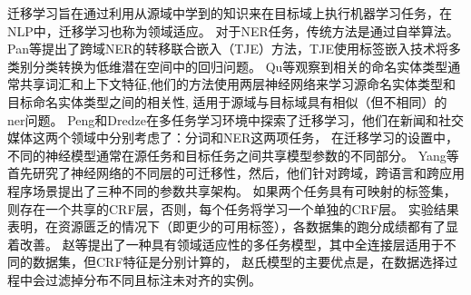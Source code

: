迁移学习旨在通过利用从源域中学到的知识来在目标域上执行机器学习任务\cite{pan2009survey}，在NLP中，迁移学习也称为领域适应。
对于NER任务，传统方法是通过自举算法。 
Pan等提出了跨域NER的转移联合嵌入（TJE）方法，TJE使用标签嵌入技术将多类别分类转换为低维潜在空间中的回归问题\cite{pan2013transfer}。 
Qu等观察到相关的命名实体类型通常共享词汇和上下文特征\cite{qu2016named},他们的方法使用两层神经网络来学习源命名实体类型和目标命名实体类型之间的相关性,
适用于源域与目标域具有相似（但不相同）的ner问题。 
Peng和Dredze在多任务学习环境中探索了迁移学习\cite{peng2016multi}，他们在新闻和社交媒体这两个领域中分别考虑了：分词和NER这两项任务，
在迁移学习的设置中，不同的神经模型通常在源任务和目标任务之间共享模型参数的不同部分。
Yang等首先研究了神经网络的不同层的可迁移性\cite{yang2017transfer}，然后，他们针对跨域，跨语言和跨应用程序场景提出了三种不同的参数共享架构。
如果两个任务具有可映射的标签集，则存在一个共享的CRF层，否则，每个任务将学习一个单独的CRF层。
实验结果表明，在资源匮乏的情况下（即更少的可用标签），各数据集的跑分成绩都有了显着改善。 
赵等提出了一种具有领域适应性的多任务模型，其中全连接层适用于不同的数据集，但CRF特征是分别计算的，
赵氏模型的主要优点是，在数据选择过程中会过滤掉分布不同且标注未对齐的实例\cite{zhao2018improve}。

